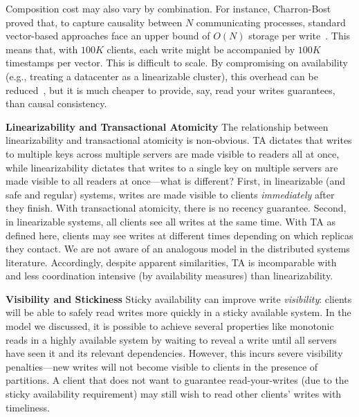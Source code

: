 Composition cost may also vary by combination. For instance, Charron-Bost
 proved that, to capture causality between $N$ communicating
processes, standard vector-based approaches face an upper bound of
$O(N)$ storage per write~\cite{charron-bost}. This means that, with
$100K$ clients, each write might be accompanied by $100K$ timestamps
per vector. This is difficult to scale. By compromising on
availability (e.g., treating a datacenter as a linearizable cluster),
this overhead can be reduced~\cite{eiger}, but it is much
cheaper to provide, say, read your writes guarantees, than causal
consistency.

\vspace{.5em}\noindent\textbf{Linearizability and Transactional
  Atomicity} The relationship between linearizability and
transactional atomicity is non-obvious. TA dictates that writes to
multiple keys across multiple servers are made visible to readers all
at once, while linearizability dictates that writes to a single key on
multiple servers are made visible to all readers at once---what is
different? First, in linearizable (and safe and regular) systems,
writes are made visible to clients \textit{immediately} after they
finish. With transactional atomicity, there is no recency
guarantee. Second, in linearizable systems, all clients see all writes
at the same time. With TA as defined here, clients may see writes at
different times depending on which replicas they contact. We are not
aware of an analogous model in the distributed systems
literature. Accordingly, despite apparent similarities, TA is
incomparable with and less coordination intensive (by availability
measures) than linearizability.

\vspace{.5em}\noindent\textbf{Visibility and Stickiness} Sticky
availability can improve write \textit{visibility}: clients will be
able to safely read writes more quickly in a sticky available
system. In the model we discussed, it is possible to achieve several
properties like monotonic reads in a highly available system by
waiting to reveal a write until all servers have seen it and its
relevant dependencies. However, this incurs severe visibility
penalties---new writes will not become visible to clients in the
presence of partitions. A client that does not want to guarantee
read-your-writes (due to the sticky availability requirement) may
still wish to read other clients' writes with timeliness.
